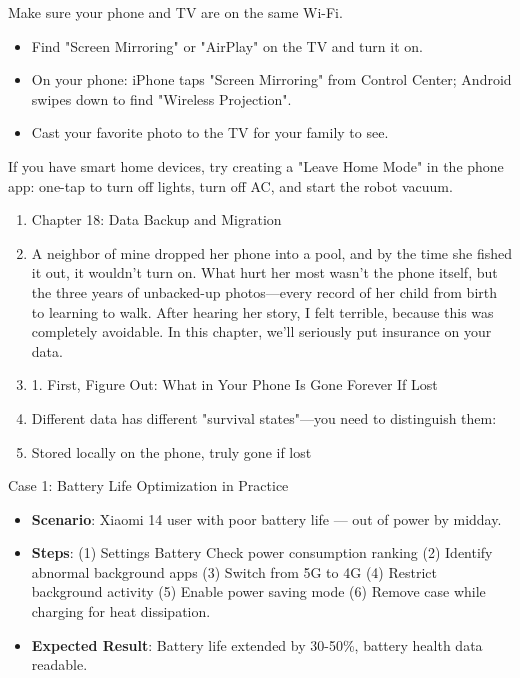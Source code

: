 
Make sure your phone and TV are on the same Wi-Fi.

\begin{itemize}
  \item Find "Screen Mirroring" or "AirPlay" on the TV and turn it on.
  \item On your phone: iPhone taps "Screen Mirroring" from Control Center; Android swipes down to find "Wireless Projection".
  \item Cast your favorite photo to the TV for your family to see.
\end{itemize}

\begin{tcbpractice}{If you have smart home devices, try creating a "Leave Home Mode" in the phone app: one-tap to turn off lights, turn off AC, and start the robot vacuum.}
\begin{enumerate}
  \item Chapter 18: Data Backup and Migration
  \item A neighbor of mine dropped her phone into a pool, and by the time she fished it out, it wouldn't turn on. What hurt her most wasn't the phone itself, but the three years of unbacked-up photos—every record of her child from birth to learning to walk. After hearing her story, I felt terrible, because this was completely avoidable. In this chapter, we'll seriously put insurance on your data.
  \item 1. First, Figure Out: What in Your Phone Is Gone Forever If Lost
  \item Different data has different "survival states"—you need to distinguish them:
  \item Stored locally on the phone, truly gone if lost
\end{enumerate}

\end{tcbpractice}

\begin{tcbinfo}{Case 1: Battery Life Optimization in Practice}
\begin{itemize}
  \item \textbf{Scenario}: Xiaomi 14 user with poor battery life — out of power by midday.
  \item \textbf{Steps}: (1) Settings Battery Check power consumption ranking (2) Identify abnormal background apps (3) Switch from 5G to 4G (4) Restrict background activity (5) Enable power saving mode (6) Remove case while charging for heat dissipation.
  \item \textbf{Expected Result}: Battery life extended by 30-50\%, battery health data readable.
\end{itemize}

\end{tcbinfo}
